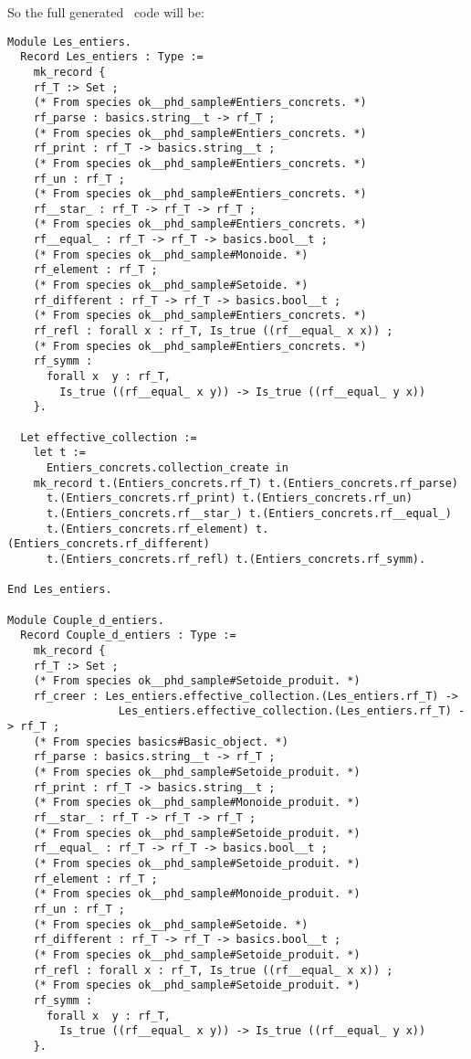 So the full generated \coq\ code will be:
{\footnotesize
\begin{lstlisting}[language=MyCoq,title=\coq\ code for collections]
Module Les_entiers.
  Record Les_entiers : Type :=
    mk_record {
    rf_T :> Set ;
    (* From species ok__phd_sample#Entiers_concrets. *)
    rf_parse : basics.string__t -> rf_T ;
    (* From species ok__phd_sample#Entiers_concrets. *)
    rf_print : rf_T -> basics.string__t ;
    (* From species ok__phd_sample#Entiers_concrets. *)
    rf_un : rf_T ;
    (* From species ok__phd_sample#Entiers_concrets. *)
    rf__star_ : rf_T -> rf_T -> rf_T ;
    (* From species ok__phd_sample#Entiers_concrets. *)
    rf__equal_ : rf_T -> rf_T -> basics.bool__t ;
    (* From species ok__phd_sample#Monoide. *)
    rf_element : rf_T ;
    (* From species ok__phd_sample#Setoide. *)
    rf_different : rf_T -> rf_T -> basics.bool__t ;
    (* From species ok__phd_sample#Entiers_concrets. *)
    rf_refl : forall x : rf_T, Is_true ((rf__equal_ x x)) ;
    (* From species ok__phd_sample#Entiers_concrets. *)
    rf_symm :
      forall x  y : rf_T,
        Is_true ((rf__equal_ x y)) -> Is_true ((rf__equal_ y x))
    }.
  
  Let effective_collection :=
    let t :=
      Entiers_concrets.collection_create in 
    mk_record t.(Entiers_concrets.rf_T) t.(Entiers_concrets.rf_parse)
      t.(Entiers_concrets.rf_print) t.(Entiers_concrets.rf_un)
      t.(Entiers_concrets.rf__star_) t.(Entiers_concrets.rf__equal_)
      t.(Entiers_concrets.rf_element) t.(Entiers_concrets.rf_different)
      t.(Entiers_concrets.rf_refl) t.(Entiers_concrets.rf_symm).
    
End Les_entiers.

Module Couple_d_entiers.
  Record Couple_d_entiers : Type :=
    mk_record {
    rf_T :> Set ;
    (* From species ok__phd_sample#Setoide_produit. *)
    rf_creer : Les_entiers.effective_collection.(Les_entiers.rf_T) ->
                 Les_entiers.effective_collection.(Les_entiers.rf_T) -> rf_T ;
    (* From species basics#Basic_object. *)
    rf_parse : basics.string__t -> rf_T ;
    (* From species ok__phd_sample#Setoide_produit. *)
    rf_print : rf_T -> basics.string__t ;
    (* From species ok__phd_sample#Monoide_produit. *)
    rf__star_ : rf_T -> rf_T -> rf_T ;
    (* From species ok__phd_sample#Setoide_produit. *)
    rf__equal_ : rf_T -> rf_T -> basics.bool__t ;
    (* From species ok__phd_sample#Setoide_produit. *)
    rf_element : rf_T ;
    (* From species ok__phd_sample#Monoide_produit. *)
    rf_un : rf_T ;
    (* From species ok__phd_sample#Setoide. *)
    rf_different : rf_T -> rf_T -> basics.bool__t ;
    (* From species ok__phd_sample#Setoide_produit. *)
    rf_refl : forall x : rf_T, Is_true ((rf__equal_ x x)) ;
    (* From species ok__phd_sample#Setoide_produit. *)
    rf_symm :
      forall x  y : rf_T,
        Is_true ((rf__equal_ x y)) -> Is_true ((rf__equal_ y x))
    }.
  

\end{lstlisting}}
